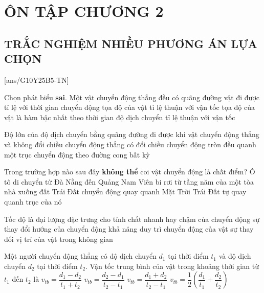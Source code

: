 \section{ÔN TẬP CHƯƠNG 2}
\subsection{TRẮC NGHIỆM NHIỀU PHƯƠNG ÁN LỰA CHỌN}
\setcounter{ex}{0}
[ans/G10Y25B5-TN]
\begin{ex}
	Chọn phát biểu \textbf{sai}. Một vật chuyển động thẳng đều có
	\choice
	{quãng đường vật đi được tỉ lệ với thời gian chuyển động}
	{\True tọa độ của vật tỉ lệ thuận với vận tốc}
	{tọa độ của vật là hàm bậc nhất theo thời gian}
	{độ dịch chuyển tỉ lệ thuận với vận tốc}
	\loigiai{}
\end{ex}

\begin{ex}
	Độ lớn của độ dịch chuyển bằng quãng đường đi được khi vật
	\choice
	{\True chuyển động thẳng và không đổi chiều}
	{chuyển động thẳng có đổi chiều}
	{chuyển động tròn đều quanh một trục}
	{chuyển động theo đường cong bất kỳ}
	\loigiai{}
\end{ex}

\begin{ex}
	Trong trường hợp nào sau đây \textbf{không thể} coi vật chuyển động là chất điểm?
	\choice
	{Ô tô di chuyển từ Đà Nẵng đến Quảng Nam}
	{Viên bi rơi từ tầng năm của một tòa nhà xuống đất}
	{Trái Đất chuyển động quay quanh Mặt Trời}
	{\True Trái Đất tự quay quanh trục của nó}
	\loigiai{}
\end{ex}

\begin{ex}
	Tốc độ là đại lượng đặc trưng cho
	\choice
	{\True tính chất nhanh hay chậm của chuyển động}
	{sự thay đổi hướng của chuyển động}
	{khả năng duy trì chuyển động của vật}
	{sự thay đổi vị trí của vật trong không gian}
	\loigiai{}
\end{ex}

\begin{ex}
	Một người chuyển động thẳng có độ dịch chuyển $d_1$ tại thời điểm $t_1$ và độ dịch chuyển $d_2$ tại thời điểm $t_2$. Vận tốc trung bình của vật trong khoảng thời gian từ $t_1$ đến $t_2$ là
	\choice
	{$v_{tb}=\dfrac{d_1-d_2}{t_1+t_2}$}
	{\True $v_{tb}=\dfrac{d_2-d_1}{t_2-t_1}$}
	{$v_{tb}=\dfrac{d_1+d_2}{t_2-t_1}$}
	{$v_{tb}=\dfrac{1}{2}\left(\dfrac{d_1}{t_1}+\dfrac{d_2}{t_2}\right)$}
	\loigiai{}
\end{ex}

